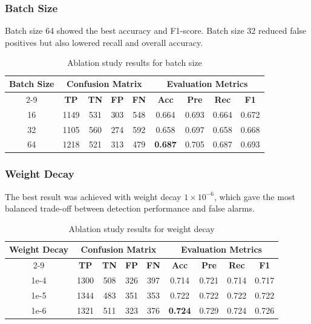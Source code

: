 \documentclass[10pt,TimesNewRoman,a4paper]{matrikenglish}
\begin{document}
\subsubsection{Batch Size}
\label{IV.batch_size}

Batch size 64 showed the best accuracy and F1-score. Batch size 32 reduced false positives but also lowered recall and overall accuracy.

\begin{table}[H]
    \centering
    \caption{Ablation study results for batch size}
    \label{tab:ablasi batch size}
    \begin{tabular}{c c c c c c c c c}
        \hline
        \multirow{2}{*}{\textbf{Batch Size}} & \multicolumn{4}{c}{\textbf{Confusion Matrix}} & \multicolumn{4}{c}{\textbf{Evaluation Metrics}} \\ \cline{2-9}
         & \textbf{TP} & \textbf{TN} & \textbf{FP} & \textbf{FN} & \textbf{Acc} & \textbf{Pre} & \textbf{Rec} & \textbf{F1} \\ \hline
        16 & 1149 & 531 & 303 & 548 & 0.664 & 0.693 & 0.664 & 0.672 \\ 
        32 & 1105 & 560 & 274 & 592 & 0.658 & 0.697 & 0.658 & 0.668 \\ 
        64 & 1218 & 521 & 313 & 479 & \textbf{0.687} & 0.705 & 0.687 & 0.693 \\ \hline
    \end{tabular}
\end{table}

\subsubsection{Weight Decay}
\label{IV.weight-decay}

The best result was achieved with weight decay \(1\times10^{-6}\), which gave the most balanced trade-off between detection performance and false alarms.

\begin{table}[H]
    \centering
    \caption{Ablation study results for weight decay}
    \label{tab:ablasi Weight Decay}
    \begin{tabular}{c c c c c c c c c}
        \hline
        \multirow{2}{*}{\textbf{Weight Decay}} & \multicolumn{4}{c}{\textbf{Confusion Matrix}} & \multicolumn{4}{c}{\textbf{Evaluation Metrics}} \\ \cline{2-9}
         & \textbf{TP} & \textbf{TN} & \textbf{FP} & \textbf{FN} & \textbf{Acc} & \textbf{Pre} & \textbf{Rec} & \textbf{F1} \\ \hline
        1e-4 & 1300 & 508 & 326 & 397 & 0.714 & 0.721 & 0.714 & 0.717 \\ 
        1e-5 & 1344 & 483 & 351 & 353 & 0.722 & 0.722 & 0.722 & 0.722 \\ 
        1e-6 & 1321 & 511 & 323 & 376 & \textbf{0.724} & 0.729 & 0.724 & 0.726 \\ \hline
    \end{tabular}
\end{table}
\end{document}

